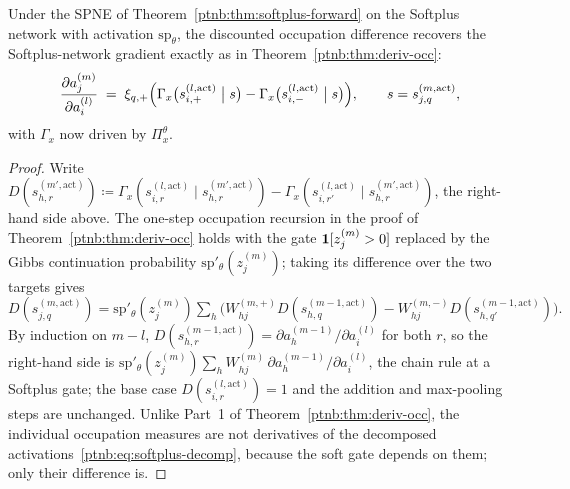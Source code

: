 \begin{theoremenv}\label{ptnb:thm:softplus-gradient}
Under the SPNE of Theorem~\ref{ptnb:thm:softplus-forward} on the Softplus network with activation
$\mathrm{sp}_\theta$, the discounted occupation difference recovers the Softplus-network gradient
exactly as in Theorem~\ref{ptnb:thm:deriv-occ}:
\begin{align}
    \frac{\partial a_j^{(m)}}{\partial a_i^{(l)}}
    \;=\;
    \xi_{q,+}\Bigl(\Gamma_x\bigl(s_{i,+}^{(l, \mathrm{act})} \bigm| s\bigr) -
    \Gamma_x\bigl(s_{i,-}^{(l, \mathrm{act})} \bigm| s\bigr)\Bigr),
    \qquad s = s_{j,q}^{(m, \mathrm{act})},
\end{align}
with $\Gamma_x$ now driven by $\Pi_x^\theta$.\end{theoremenv}

\begin{proof}
Write $D(s_{h,r}^{(m',\mathrm{act})}) \coloneqq \Gamma_x(s_{i,r}^{(l,\mathrm{act})} \mid
    s_{h,r}^{(m',\mathrm{act})}) - \Gamma_x(s_{i,r'}^{(l,\mathrm{act})} \mid
    s_{h,r}^{(m',\mathrm{act})})$, the right-hand side above. The one-step occupation recursion in the
proof of Theorem~\ref{ptnb:thm:deriv-occ} holds with the gate $\mathbf{1}[z_j^{(m)} > 0]$ replaced by the Gibbs
continuation probability $\mathrm{sp}'_\theta(z_j^{(m)})$; taking its difference over the two
targets gives
\(
    D(s_{j,q}^{(m,\mathrm{act})}) = \mathrm{sp}'_\theta(z_j^{(m)}) \sum_h \bigl( W_{hj}^{(m,+)}
    D(s_{h,q}^{(m-1,\mathrm{act})}) - W_{hj}^{(m,-)} D(s_{h,q'}^{(m-1,\mathrm{act})}) \bigr).
\)
By induction on $m-l$, $D(s_{h,r}^{(m-1,\mathrm{act})}) = \partial a_h^{(m-1)}/\partial a_i^{(l)}$
for both $r$, so the right-hand side is $\mathrm{sp}'_\theta(z_j^{(m)}) \sum_h W_{hj}^{(m)}\,
    \partial a_h^{(m-1)}/\partial a_i^{(l)}$, the chain rule at a Softplus gate; the base case
$D(s_{i,r}^{(l,\mathrm{act})}) = 1$ and the addition and max-pooling steps are unchanged. Unlike
Part~1 of Theorem~\ref{ptnb:thm:deriv-occ}, the individual occupation measures are not derivatives of
the decomposed activations~\eqref{ptnb:eq:softplus-decomp}, because the soft gate depends on them; only
their difference is.
\end{proof}

